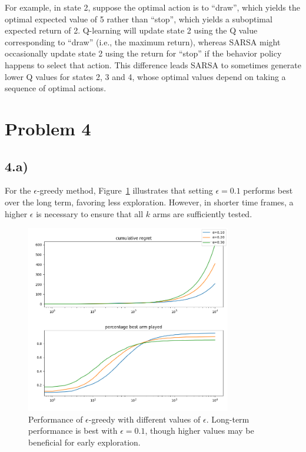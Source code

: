 \documentclass[11pt]{article}
\begin{document}
For example, in state 2, suppose the optimal action is to “draw”, which yields the optimal expected value of 5 rather than “stop”, which yields a suboptimal
expected return of 2. Q-learning will update state 2 using the Q value corresponding to “draw” (i.e., the maximum return), whereas SARSA might occasionally
update state 2 using the return for “stop” if the behavior policy happens to select that action. This difference leads SARSA to sometimes generate
lower Q values for states 2, 3 and 4, whose optimal values depend on taking a sequence of optimal actions.

\newpage
\section*{Problem 4}

\subsection*{4.a)}

For the $\epsilon$-greedy method, Figure~\ref{fig:epsilon} illustrates that setting $\epsilon = 0.1$ performs best over the long term,
favoring less exploration. However, in shorter time frames, a higher $\epsilon$ is necessary to ensure that all $k$ arms are sufficiently tested.

\begin{figure}[htbp]
\centering
\includegraphics[width=0.8\textwidth]{images/Figure_2.png}
\caption{Performance of $\epsilon$-greedy with different values of $\epsilon$. Long-term performance is best with $\epsilon = 0.1$,
though higher values may be beneficial for early exploration.}
\label{fig:epsilon}
\end{figure}
\end{document}
